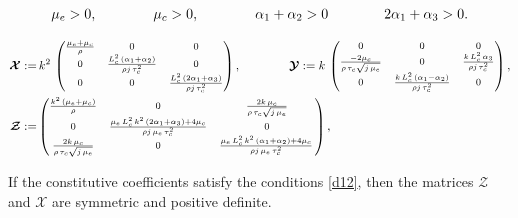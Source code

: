 \documentclass[10pt,a4paper]{amsart}
\begin{document}
	\begin{align}\label{d12}
	\mu_{\rm e} >0,\qquad \qquad \mu_{\rm c} >0,\qquad \qquad   \alpha_1+\alpha_2>0 \qquad \qquad 2\alpha_1+\alpha_3 >0.
	\end{align}

 \begin{align}\label{nTQ}
 \boldsymbol{\mathcal{X}}:=&\,k^2\,\begin{footnotesize}\begin{pmatrix}  \frac{\mu_{\rm e} +\mu_{\rm c}}{\rho} &0	&0
 	\\
 	0& \frac{L_{\rm c}^2\,(\alpha_1+\alpha_2)}{\rho j\,\tau_{\rm c}^2} 
 	&0
 	\\0
 	& 0 & \frac{{L_{\rm c}^2}\,(2\alpha_1+\alpha_3)}{\rho j\,\tau_{\rm c}^2} \end{pmatrix}\end{footnotesize}, \qquad \qquad 
\boldsymbol{\mathcal{Y}}:= k\,\begin{footnotesize}\begin{pmatrix}  0& 0 & 0
 	\\
 	\frac{-2\mu_{\rm c}}{{\rho\,\tau_{\rm c}\sqrt{j\,\mu_{\rm e}}}} & 0 
 	& \frac{k{\,L_{\rm c}^2}\,\alpha_3}{\rho j\,\tau_{\rm c}^2}
 	\\0  
 	& \frac{k{\,L_{\rm c}^2}\,(\alpha_1-\alpha_2)}{\rho j\,\tau_{\rm c}^2} & 0 \end{pmatrix}\end{footnotesize},\notag\\
\boldsymbol{\mathcal{Z}}:=&\begin{footnotesize}\begin{pmatrix} \frac{k^2\,(\mu_{\rm e} +\mu_{\rm c} )}{\rho} & 0	& \frac{2k\,\mu_{\rm c}}{{\rho\,\tau_{\rm c}\sqrt{j\,\mu_{\rm e}}}}
 	\\
 	0 & \frac{{\mu_{\rm e}\,L_{\rm c}^2}\,k^2\,(2\alpha_1+\alpha_3)+4 \mu_{\rm c}}{\rho j\,\mu_{\rm e}\,\tau_{\rm c}^2}
 	& 0
 	\\\frac{2k\,\mu_{\rm c}}{{\rho\,\tau_{\rm c}\sqrt{j\,\mu_{\rm e}}}}
 	& 0 & \frac{{\mu_{\rm e}\,L_{\rm c}^2}\,k^2\,(\alpha_1+\alpha_2)+4 \mu_{\rm c}}{\rho j\,\mu_{\rm e}\,\tau_{\rm c}^2} \, \end{pmatrix}\end{footnotesize},
 \end{align}

 \begin{lemma}If  the constitutive coefficients satisfy the conditions 	\eqref{d12},
 then the	 matrices $\boldsymbol{\mathcal{Z}}$ and $\boldsymbol{\mathcal{X}}$ are symmetric and positive definite.	
 \end{lemma}
\end{document}
